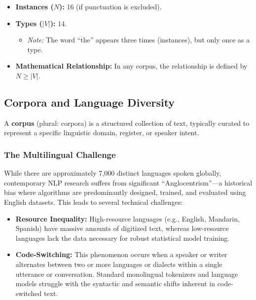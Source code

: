 \documentclass[
  italian,
  11pt,
]{article}
\providecommand{\tightlist}{%
  \setlength{\itemsep}{0pt}\setlength{\parskip}{0pt}}
\begin{document}
\begin{itemize}
\tightlist
\item
  \textbf{Instances (\(N\)):} 16 (if punctuation is excluded).
\item
  \textbf{Types (\(|V|\)):} 14.

  \begin{itemize}
  \tightlist
  \item
    \emph{Note:} The word ``the'' appears three times (instances), but
    only once as a type.
  \end{itemize}
\item
  \textbf{Mathematical Relationship:} In any corpus, the relationship is
  defined by \(N \geq |V|\).
\end{itemize}

\subsection{Corpora and Language
Diversity}\label{corpora-and-language-diversity}

A \textbf{corpus} (plural: corpora) is a structured collection of text,
typically curated to represent a specific linguistic domain, register,
or speaker intent.

\subsubsection{The Multilingual
Challenge}\label{the-multilingual-challenge}

While there are approximately 7,000 distinct languages spoken globally,
contemporary NLP research suffers from significant ``Anglocentrism''---a
historical bias where algorithms are predominantly designed, trained,
and evaluated using English datasets. This leads to several technical
challenges:

\begin{itemize}
\tightlist
\item
  \textbf{Resource Inequality:} High-resource languages (e.g., English,
  Mandarin, Spanish) have massive amounts of digitized text, whereas
  low-resource languages lack the data necessary for robust statistical
  model training.
\item
  \textbf{Code-Switching:} This phenomenon occurs when a speaker or
  writer alternates between two or more languages or dialects within a
  single utterance or conversation. Standard monolingual tokenizers and
  language models struggle with the syntactic and semantic shifts
  inherent in code-switched text.
\end{itemize}
\end{document}
